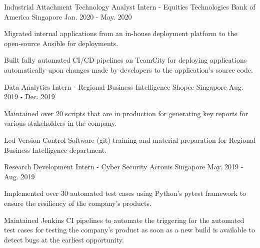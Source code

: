 

\begin{cventries}

  \cventry
    {Industrial Attachment Technology Analyst Intern - Equities Technologies} %
    {Bank of America} %
    {Singapore} %
    {Jan. 2020 - May. 2020} %
    {
      \begin{cvitems} %
        \item {Migrated internal applications from an in-house deployment platform to  the open-source Ansible for deployments.}
        \item {Built fully automated CI/CD pipelines on TeamCity for deploying applications automatically upon changes made by developers to the application's source code.}
      \end{cvitems}
    }

  \cventry
    {Data Analytics Intern - Regional Business Intelligence} %
    {Shopee} %
    {Singapore} %
    {Aug. 2019 - Dec. 2019} %
    {
      \begin{cvitems} %
        \item {Maintained over 20 scripts that are in production for generating key reports for various stakeholders in the company.}
        \item {Led Version Control Software (git) training and material preparation for Regional Business Intelligence department.}
      \end{cvitems}
    }

  \cventry
    {Research Development Intern - Cyber Security} %
    {Acronis} %
    {Singapore} %
    {May. 2019 - Aug. 2019} %
    {
      \begin{cvitems} %
        \item {Implemented over 30 automated test cases using Python’s pytest framework to ensure the resiliency of the company’s products.}
        \item {Maintained Jenkins CI pipelines to automate the triggering for the automated test cases for testing the company’s product as soon as a new build is available to detect bugs at the earliest opportunity.}
      \end{cvitems}
    }


\end{cventries}
